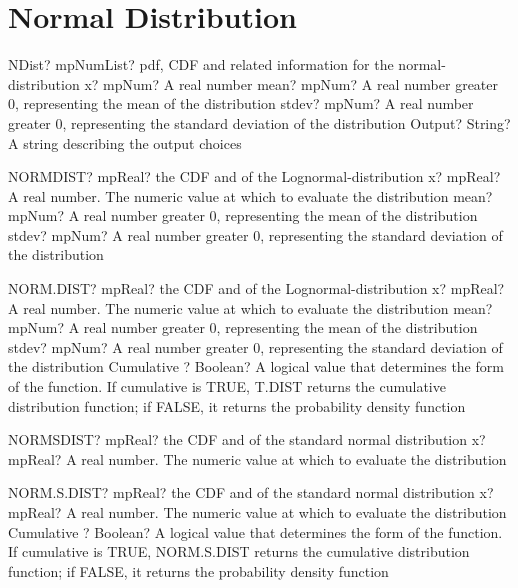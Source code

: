 \documentclass[12pt,a4paper,openany]{book}
\begin{document}
\section{Normal Distribution}

\begin{mpFunctionsExtract}
\mpFunctionFourNotImplemented
{NDist? mpNumList? pdf, CDF and related information for the normal-distribution}
{x? mpNum? A real number}
{mean? mpNum? A real number greater 0, representing the mean of the distribution}
{stdev? mpNum? A real number greater 0, representing the standard deviation of the distribution}
{Output? String? A string describing the output choices}
\end{mpFunctionsExtract}

\begin{mpFunctionsExtract}
\mpWorksheetFunctionThreeNotImplemented
{NORMDIST? mpReal? the CDF and of the Lognormal-distribution}
{x? mpReal? A real number. The numeric value at which to evaluate the distribution}
{mean? mpNum? A real number greater 0, representing the mean of the distribution}
{stdev? mpNum? A real number greater 0, representing the standard deviation of the distribution}
\end{mpFunctionsExtract}

\begin{mpFunctionsExtract}
\mpWorksheetFunctionFourNotImplemented
{NORM.DIST? mpReal? the CDF and of the Lognormal-distribution}
{x? mpReal? A real number. The numeric value at which to evaluate the distribution}
{mean? mpNum? A real number greater 0, representing the mean of the distribution}
{stdev? mpNum? A real number greater 0, representing the standard deviation of the distribution}
{Cumulative ? Boolean? A logical value that determines the form of the function. If cumulative is TRUE, T.DIST returns the cumulative distribution function; if FALSE, it returns the probability density function}
\end{mpFunctionsExtract}

\begin{mpFunctionsExtract}
\mpWorksheetFunctionOneNotImplemented
{NORMSDIST? mpReal? the CDF and of the  standard normal distribution}
{x? mpReal? A real number. The numeric value at which to evaluate the distribution}
\end{mpFunctionsExtract}

\begin{mpFunctionsExtract}
\mpWorksheetFunctionTwoNotImplemented
{NORM.S.DIST? mpReal? the CDF and of the  standard normal distribution}
{x? mpReal? A real number. The numeric value at which to evaluate the distribution}
{Cumulative ? Boolean? A logical value that determines the form of the function. If cumulative is TRUE, NORM.S.DIST returns the cumulative distribution function; if FALSE, it returns the probability density function}
\end{mpFunctionsExtract}
\end{document}
